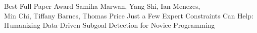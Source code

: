 \documentclass[a4paper,landscape]{article} %
\begin{document}
\diploma
    {Best Full Paper Award}
    {Samiha Marwan, Yang Shi, Ian Menezes,\\ Min Chi, Tiffany Barnes, Thomas Price}
    {Just a Few Expert Constraints Can Help: Humanizing Data-Driven Subgoal Detection for Novice Programming}
\hfill
\end{document}
